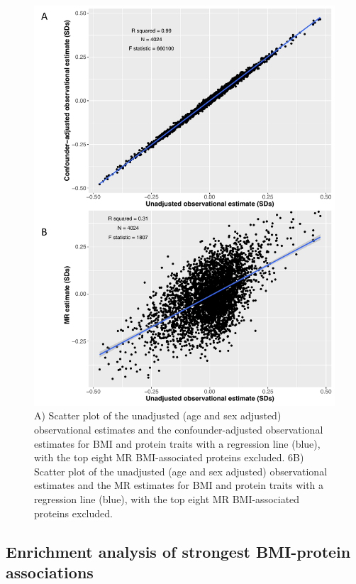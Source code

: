 \documentclass[11pt,twoside]{bristolthesis}
\begin{document}
\begin{figure}
\includegraphics[width=0.95\linewidth,height=0.95\textheight]{figure/BMI_protein_INTERVAL/Obs_MR_scatter_without_top8} \caption[Scatter plot comparing BMI-protein estimates across models with top eight BMI-associated proteins excluded]{A) Scatter plot of the unadjusted (age and sex adjusted) observational estimates and the confounder-adjusted observational estimates for BMI and protein traits with a regression line (blue), with the top eight MR BMI-associated proteins excluded. 6B) Scatter plot of the unadjusted (age and sex adjusted) observational estimates and the MR estimates for BMI and protein traits with a regression line (blue), with the top eight MR BMI-associated proteins excluded.}\label{fig:Obs-MR-without-top8}
\end{figure}
\hypertarget{enrichment-analysis-of-strongest-bmi-protein-associations}{%
\subsection{Enrichment analysis of strongest BMI-protein associations}\label{enrichment-analysis-of-strongest-bmi-protein-associations}}
\end{document}
